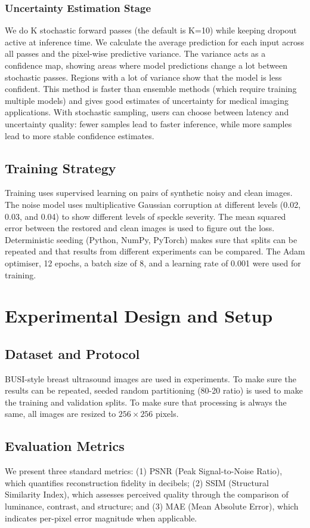 \documentclass[conference]{IEEEtran}
\begin{document}
\subsubsection{Uncertainty Estimation Stage}
We do K stochastic forward passes (the default is K=10) while keeping dropout active at inference time. We calculate the average prediction for each input across all passes and the pixel-wise predictive variance. The variance acts as a confidence map, showing areas where model predictions change a lot between stochastic passes. Regions with a lot of variance show that the model is less confident. This method is faster than ensemble methods (which require training multiple models) and gives good estimates of uncertainty for medical imaging applications. With stochastic sampling, users can choose between latency and uncertainty quality: fewer samples lead to faster inference, while more samples lead to more stable confidence estimates.

\subsection{Training Strategy}
Training uses supervised learning on pairs of synthetic noisy and clean images. The noise model uses multiplicative Gaussian corruption at different levels (0.02, 0.03, and 0.04) to show different levels of speckle severity. The mean squared error between the restored and clean images is used to figure out the loss. Deterministic seeding (Python, NumPy, PyTorch) makes sure that splits can be repeated and that results from different experiments can be compared. The Adam optimiser, 12 epochs, a batch size of 8, and a learning rate of 0.001 were used for training.

\section{Experimental Design and Setup}
\subsection{Dataset and Protocol}
BUSI-style breast ultrasound images are used in experiments. To make sure the results can be repeated, seeded random partitioning (80-20 ratio) is used to make the training and validation splits. To make sure that processing is always the same, all images are resized to $256 \times 256$ pixels.

\subsection{Evaluation Metrics}
We present three standard metrics: (1) PSNR (Peak Signal-to-Noise Ratio), which quantifies reconstruction fidelity in decibels; (2) SSIM (Structural Similarity Index), which assesses perceived quality through the comparison of luminance, contrast, and structure; and (3) MAE (Mean Absolute Error), which indicates per-pixel error magnitude when applicable.
\end{document}

